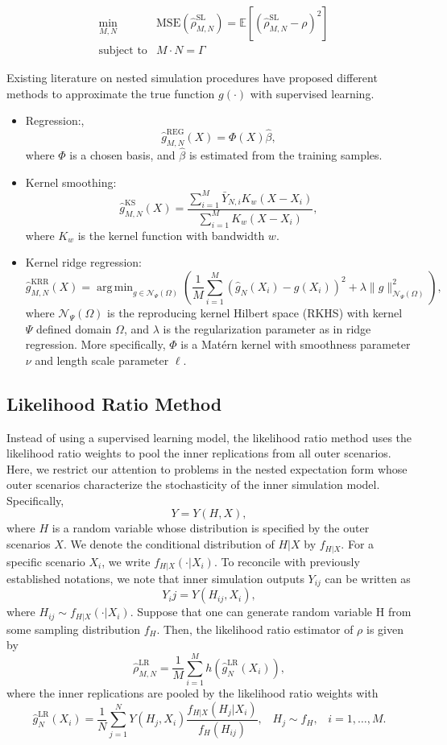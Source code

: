 \documentclass{article}
\DeclareMathOperator*{\argmin}{arg\,min}
\begin{document}
\begin{align}
    & \min_{M, N}  & \text{MSE}(\hat{\rho}^{\text{SL}}_{M, N}) = \mathbb{E} \left[ \left( \hat{\rho}^{\text{SL}}_{M, N} - \rho \right)^2 \right] \nonumber \\
    & \text{subject to} & M \cdot N = \Gamma 
\end{align}

Existing literature on nested simulation procedures have proposed different methods to approximate the true function $g(\cdot)$ with supervised learning.

\begin{itemize}
    \item   Regression:,
            $$\hat{g}^{\text{REG}}_{M, N}(X) = \Phi(X) \hat{\beta},$$
            where $\Phi$ is a chosen basis, and $\hat{\beta}$ is estimated from the training samples.
    \item   Kernel smoothing:
            $$\hat{g}^{\text{KS}}_{M, N}(X) = \frac{\sum_{i=1}^M \bar{Y}_{N, i} K_w(X - X_i)}{\sum_{i=1}^M K_w(X - X_i)}, $$
            where $K_w$ is the kernel function with bandwidth $w$.
    \item   Kernel ridge regression:
            $$\hat{g}^{\text{KRR}}_{M, N}(X) = \argmin_{g \in \mathcal{N}_{\Psi}(\Omega)} \left( \frac{1}{M} \sum_{i=1}^M (\hat{g}_N(X_i) - g(X_i))^2 + \lambda \|g\|_{\mathcal{N}_{\Psi}(\Omega)}^2\right),$$
            where $\mathcal{N}_{\Psi}(\Omega)$ is the reproducing kernel Hilbert space (RKHS) with kernel $\Psi$ defined domain $\Omega$, and $\lambda$ is the regularization parameter as in ridge regression. 
            More specifically, $\Phi$ is a Mat\'ern kernel with smoothness parameter $\nu$ and length scale parameter $\ell$.
\end{itemize}

\subsection{Likelihood Ratio Method}

Instead of using a supervised learning model, the likelihood ratio method uses the likelihood ratio weights to pool the inner replications from all outer scenarios.
Here, we restrict our attention to problems in the nested expectation form whose outer scenarios characterize the stochasticity of the inner simulation model. 
Specifically,
$$ Y = Y(H, X), $$
where $H$ is a random variable whose distribution is specified by the outer scenarios $X$. 
We denote the conditional distribution of $H|X$ by $f_{H|X}$. 
For a specific scenario $X_i$, we write $f_{H|X}(\cdot |X_i)$. 
To reconcile with previously established notations, we note that inner simulation outputs $Y_{ij}$ can be written as
$$ Y_ij = Y(H_{ij}, X_i), $$
where $H_{ij} \sim f_{H|X}(\cdot |X_i)$.
Suppose that one can generate random variable H from some sampling
distribution $f_H$. Then, the likelihood ratio estimator of $\rho$ is given by
$$\hat{\rho}^{\text{LR}}_{M,N} = \frac{1}{M} \sum_{i=1}^M h(\hat{g}^{\text{LR}}_N(X_i)), $$ where the inner replications are pooled by the likelihood ratio weights with
$$\hat{g}^{\text{LR}}_N(X_i) = \frac{1}{N} \sum_{j=1}^N Y(H_j, X_i) \frac{f_{H|X}(H_{j}|X_i)}{f_H(H_{ij})}, \;\;\; H_j \sim f_H, \;\;\; i=1, \dots, M.$$
\end{document}
